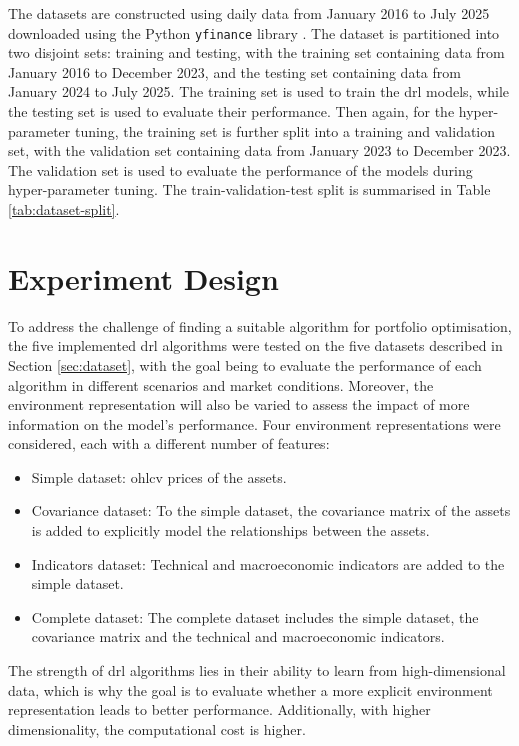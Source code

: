 The datasets are constructed using daily data from January 2016 to July 2025 downloaded using the Python \texttt{yfinance} library \cite{yfinance}. The dataset is partitioned into two disjoint sets: training and testing, with the training set containing data from January 2016 to December 2023, and the testing set containing data from January 2024 to July 2025. The training set is used to train the \acrshort{drl} models, while the testing set is used to evaluate their performance. Then again, for the hyper-parameter tuning, the training set is further split into a training and validation set, with the validation set containing data from January 2023 to December 2023. The validation set is used to evaluate the performance of the models during hyper-parameter tuning. The train-validation-test split is summarised in Table \ref{tab:dataset-split}.



\section{Experiment Design} \label{sec:experiment-design}

To address the challenge of finding a suitable algorithm for portfolio optimisation, the five implemented \acrshort{drl} algorithms were tested on the five datasets described in Section \ref{sec:dataset}, with the goal being to evaluate the performance of each algorithm in different scenarios and market conditions. Moreover, the environment representation will also be varied to assess the impact of more information on the model's performance. Four environment representations were considered, each with a different number of features:
\begin{itemize}
    \item Simple dataset: \acrfull{ohlcv} prices of the assets.
    \item Covariance dataset: To the simple dataset, the covariance matrix of the assets is added to explicitly model the relationships between the assets.
    \item Indicators dataset: Technical and macroeconomic indicators are added to the simple dataset.
    \item Complete dataset: The complete dataset includes the simple dataset, the covariance matrix and the technical and macroeconomic indicators.
\end{itemize}

The strength of \acrshort{drl} algorithms lies in their ability to learn from high-dimensional data, which is why the goal is to evaluate whether a more explicit environment representation leads to better performance. Additionally, with higher dimensionality, the computational cost is higher.

